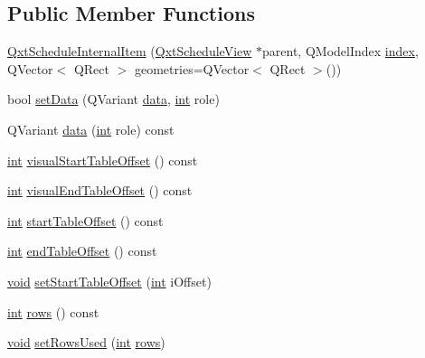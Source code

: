 \subsection*{Public Member Functions}
\begin{DoxyCompactItemize}
\item 
\hyperlink{class_qxt_schedule_internal_item_aa85481cc7606deeafe2e23040a97c3b7}{Qxt\-Schedule\-Internal\-Item} (\hyperlink{class_qxt_schedule_view}{Qxt\-Schedule\-View} $\ast$parent, Q\-Model\-Index \hyperlink{glext_8h_ab47dd9958bcadea08866b42bf358e95e}{index}, Q\-Vector$<$ Q\-Rect $>$ geometries=Q\-Vector$<$ Q\-Rect $>$())
\item 
bool \hyperlink{class_qxt_schedule_internal_item_a356a0c326b9e0089e7864a0ff588085c}{set\-Data} (Q\-Variant \hyperlink{glext_8h_a8850df0785e6fbcc2351af3b686b8c7a}{data}, \hyperlink{ioapi_8h_a787fa3cf048117ba7123753c1e74fcd6}{int} role)
\item 
Q\-Variant \hyperlink{class_qxt_schedule_internal_item_ad1564318da5aa473bbc82da8308624ff}{data} (\hyperlink{ioapi_8h_a787fa3cf048117ba7123753c1e74fcd6}{int} role) const 
\item 
\hyperlink{ioapi_8h_a787fa3cf048117ba7123753c1e74fcd6}{int} \hyperlink{class_qxt_schedule_internal_item_aa1468168bf96eae18b0598fa833c50c8}{visual\-Start\-Table\-Offset} () const 
\item 
\hyperlink{ioapi_8h_a787fa3cf048117ba7123753c1e74fcd6}{int} \hyperlink{class_qxt_schedule_internal_item_a1854df6bdb019cfb6dc8a101a08d944e}{visual\-End\-Table\-Offset} () const 
\item 
\hyperlink{ioapi_8h_a787fa3cf048117ba7123753c1e74fcd6}{int} \hyperlink{class_qxt_schedule_internal_item_a174e766d14b0c4a43ede890340c0b50d}{start\-Table\-Offset} () const 
\item 
\hyperlink{ioapi_8h_a787fa3cf048117ba7123753c1e74fcd6}{int} \hyperlink{class_qxt_schedule_internal_item_a5920ba22d0e62756ab5185e5c9002e63}{end\-Table\-Offset} () const 
\item 
\hyperlink{group___u_a_v_objects_plugin_ga444cf2ff3f0ecbe028adce838d373f5c}{void} \hyperlink{class_qxt_schedule_internal_item_a3abe9990aedddd7d6539aefc40c167bb}{set\-Start\-Table\-Offset} (\hyperlink{ioapi_8h_a787fa3cf048117ba7123753c1e74fcd6}{int} i\-Offset)
\item 
\hyperlink{ioapi_8h_a787fa3cf048117ba7123753c1e74fcd6}{int} \hyperlink{class_qxt_schedule_internal_item_a6c471c01531e9a68c36ec6c0b51c636b}{rows} () const 
\item 
\hyperlink{group___u_a_v_objects_plugin_ga444cf2ff3f0ecbe028adce838d373f5c}{void} \hyperlink{class_qxt_schedule_internal_item_a06cc787aca6e8c254660cfe2e0a68707}{set\-Rows\-Used} (\hyperlink{ioapi_8h_a787fa3cf048117ba7123753c1e74fcd6}{int} \hyperlink{class_qxt_schedule_internal_item_a6c471c01531e9a68c36ec6c0b51c636b}{rows})

\end{DoxyCompactItemize}
